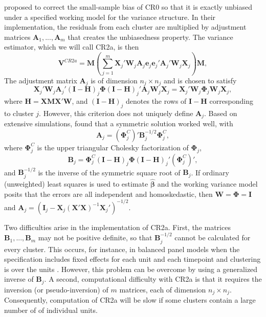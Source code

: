 \documentclass[12pt]{article}\usepackage[]{graphicx}\usepackage[]{color}
\newcommand{\bm}{\mathbf}
\newcommand{\bs}{\boldsymbol}
\begin{document}
\citet[see also \citealp{Bell2002bias}]{McCaffrey2001generalizations} proposed to correct the small-sample bias of CR0 so that it is exactly unbiased under a specified working model for the variance structure. 
In their implementation, the residuals from each cluster are multiplied by adjustment matrices $\bm{A}_1,...,\bm{A}_m$ that creates the unbiasedness property. 
The variance estimator, which we will call CR2a, is then 
\begin{equation}
\label{eq:V_CR2a}
\bm{V}^{CR2a} = \bm{M}\left(\sum_{j=1}^m \bm{X}_j'\bm{W}_j \bm{A}_j \bm{e}_j \bm{e}_j' \bm{A}_j' \bm{W}_j \bm{X}_j\right) \bm{M},
\end{equation}
The adjustment matrix $\bm{A}_j$ is of dimension $n_j \times n_j$ and is chosen to satisfy
\begin{equation}
\label{eq:CR2a_criterion}
\bm{X}_j' \bm{W}_j \bm{A}_j' \left(\bm{I} - \bm{H}\right)_j \bs\Phi \left(\bm{I} - \bm{H}\right)_j' \bm{A}_j \bm{W}_j \bm{X}_j = \bm{X}_j' \bm{W}_j \bs\Phi_j \bm{W}_j \bm{X}_j,
\end{equation}
where $\bm{H} = \bm{X}\bm{M}\bm{X}'\bm{W}$, and $\left(\bm{I} - \bm{H}\right)_j$ denotes the rows of $\bm{I} - \bm{H}$ corresponding to cluster $j$. 
However, this criterion does not uniquely define $\bm{A}_j$. 
Based on extensive simulations, \citet{McCaffrey2001generalizations} found that a symmetric solution worked well, with 
\begin{equation}
\label{eq:CR2a_adjustment}
\bm{A}_j = \left(\bs\Phi_j^C\right)' \bm{B}_j^{-1/2}\bs\Phi_j^C,
\end{equation}
where $\bs\Phi_j^C$ is the upper triangular Cholesky factorization of $\bs\Phi_j$, 
\begin{equation}
\label{eq:CR2a_Bmatrix}
\bm{B}_j = \bs\Phi_j^C\left(\bm{I} - \bm{H}\right)_j \bs\Phi \left(\bm{I} - \bm{H}\right)_j' \left(\bs\Phi_j^C\right)',
\end{equation}
and $\bm{B}_j^{-1/2}$ is the inverse of the symmetric square root of $\bm{B}_j $. 
If ordinary (unweighted) least squares is used to estimate $\bs{\hat\beta}$ and the working variance model posits that the errors are all independent and homoskedastic, then $\bm{W} = \bs\Phi = \bm{I}$ and $\bm{A}_j = \left(\bm{I}_j - \bm{X}_j\left(\bm{X}'\bm{X}\right)^{-1}\bm{X}_j'\right)^{-1/2}$.

Two difficulties arise in the implementation of CR2a.
First, the matrices $\bm{B}_1,...,\bm{B}_m$ may not be positive definite, so that $\bm{B}_j^{-1/2}$ cannot be calculated for every cluster. 
This occurs, for instance, in balanced panel models when the specification includes fixed effects for each unit and each timepoint and clustering is over the units \citep[p. ??]{Angrist2009mostly}. 
However, this problem can be overcome by using a generalized inverse of $\bm{B}_j$. 
A second, computational difficulty with CR2a is that it requires the inversion (or pseudo-inversion) of $m$ matrices, each of dimension $n_j \times n_j$. 
Consequently, computation of CR2a will be slow if some clusters contain a large number of of individual units. 
\end{document}
